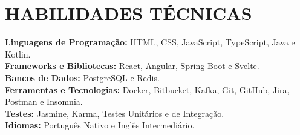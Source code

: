 \section{HABILIDADES TÉCNICAS}
\begin{itemize}[leftmargin=0in, label={}]
	\small{\item{
		\textbf{Linguagens de Programação:}
		{HTML, CSS, JavaScript, TypeScript, Java e Kotlin.}
		\vspace{2pt} \\
				
		\textbf{Frameworks e Bibliotecas:}
		{React, Angular, Spring Boot e Svelte.}
		\vspace{2pt} \\
						     
		\textbf{Bancos de Dados:}
		{PostgreSQL e Redis.}
		\vspace{2pt} \\

		\textbf{Ferramentas e Tecnologias:}
		{Docker, Bitbucket, Kafka, Git, GitHub, Jira, Postman e Insomnia.}
		\vspace{2pt} \\

		\textbf{Testes:}
		{Jasmine, Karma, Testes Unitários e de Integração.}
		\vspace{2pt} \\
						     
		\textbf{Idiomas:}
		{Português Nativo e Inglês Intermediário.}
	}}
\end{itemize}